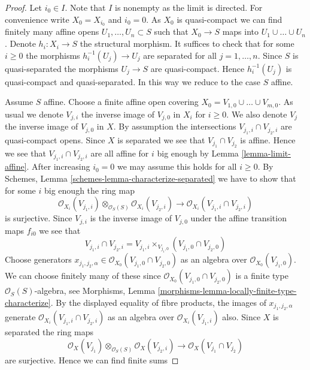 \begin{proof}
Let $i_0 \in I$. Note that $I$ is nonempty as the limit is directed.
For convenience write $X_0 = X_{i_0}$ and $i_0 = 0$.
As $X_0$ is quasi-compact we can find finitely many
affine opens $U_1, \ldots, U_n \subset S$ such that
$X_0 \to S$ maps into $U_1 \cup \ldots \cup U_n$.
Denote $h_i : X_i \to S$ the structural morphism.
It suffices to check that for some $i \geq 0$ the morphisms
$h_i^{-1}(U_j) \to U_j$ are separated for all $j = 1, \ldots,  n$.
Since $S$ is quasi-separated the morphisms $U_j \to S$ are quasi-compact.
Hence $h_i^{-1}(U_j)$ is quasi-compact and quasi-separated.
In this way we reduce to the case $S$ affine.

\medskip\noindent
Assume $S$ affine. Choose a finite affine open covering
$X_0 = V_{1, 0} \cup \ldots \cup V_{m, 0}$. As usual we denote
$V_{j, i}$ the inverse image of $V_{j, 0}$ in $X_i$ for
$i \geq 0$. We also denote $V_j$ the inverse image of
$V_{j, 0}$ in $X$. By assumption the intersections
$V_{j_1, i} \cap V_{j_2, i}$ are quasi-compact opens.
Since $X$ is separated we see that $V_{j_1} \cap V_{j_2}$
is affine. Hence we see that $V_{j_1, i} \cap V_{j_2, i}$
are all affine for $i$ big enough by Lemma \ref{lemma-limit-affine}.
After increasing $i_0 = 0$ we may assume this holds for
all $i \geq 0$.
By Schemes, Lemma \ref{schemes-lemma-characterize-separated}
we have to show that for some
$i$ big enough the ring map
$$
\mathcal{O}_{X_i}(V_{j_1, i})
\otimes_{\mathcal{O}_S(S)}
\mathcal{O}_{X_i}(V_{j_2, i})
\longrightarrow
\mathcal{O}_{X_i}(V_{j_1, i} \cap V_{j_2, i})
$$
is surjective. Since $V_{j, i}$ is the inverse image of
$V_{j, 0}$ under the affine transition maps $f_{i0}$ we
see that
$$
V_{j_1, i} \cap V_{j_2, i} =
V_{j_1, i} \times_{V_{j_1, 0}} (V_{j_1, 0} \cap V_{j_2, 0})
$$
Choose generators
$x_{j_1, j_2, \alpha} \in \mathcal{O}_{X_0}(V_{j_1, 0} \cap V_{j_2, 0})$
as an algebra over $\mathcal{O}_{X_0}(V_{j_1, 0})$.
We can choose finitely many of these since
$\mathcal{O}_{X_0}(V_{j_1, 0} \cap V_{j_2, 0})$
is a finite type $\mathcal{O}_S(S)$-algebra, see
Morphisms, Lemma \ref{morphisms-lemma-locally-finite-type-characterize}.
By the displayed equality of fibre products,
the images of $x_{j_1, j_2, \alpha}$ generate
$\mathcal{O}_{X_i}(V_{j_1, i} \cap V_{j_2, i})$ as an algebra over
$\mathcal{O}_{X_i}(V_{j_1, i})$ also.
Since $X$ is separated the ring maps
$$
\mathcal{O}_{X}(V_{j_1})
\otimes_{\mathcal{O}_S(S)}
\mathcal{O}_{X}(V_{j_2, i})
\longrightarrow
\mathcal{O}_{X}(V_{j_1} \cap V_{j_2})
$$
are surjective. Hence we can find finite sums

\end{proof}
